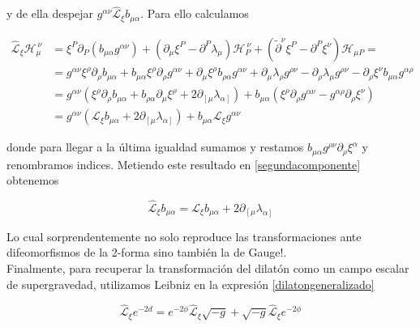 \documentclass{article}
\numberwithin{equation}{section}
\begin{document}
y de ella despejar $ g^{\alpha \nu}  \hat{\mathcal{L}}_{\xi} b_{\mu\alpha} $. Para ello calculamos

\begin{equation}\label{key}
\begin{aligned}
\hat{\mathcal{L}}_{\xi} \mathcal{H}_{\mu}^{\ \nu} &= \xi^P\partial_P \left(b_{\mu\alpha}g^{\alpha\nu}\right) + \left(\partial_{\mu} \xi^P - \partial^P\lambda_{\mu}\right)\mathcal{H}_P^{\ \nu} + \left(\widetilde{\partial}^{\nu} \xi^P - \partial^P\xi^{\nu}\right)\mathcal{H}_{\mu P}=\\
&=g^{\alpha\nu} \xi^{\rho}\partial_{\rho} b_{\mu\alpha} + b_{\mu\alpha} \xi^{\rho}\partial_{\rho}g^{\alpha\nu} +\partial_{\mu} \xi^{\rho}b_{\rho\alpha}g^{\alpha\nu} +\partial_{\mu} \lambda_{\rho}g^{\rho\nu} - \partial_{\rho}\lambda_{\mu}g^{\rho\nu} - \partial_{\rho}\xi^{\nu}b_{\mu\alpha}g^{\alpha\rho}\\
&= g^{\alpha\nu} \left( \xi^{\rho}\partial_{\rho} b_{\mu\alpha} + b_{\rho\alpha} \partial_{\mu} \xi^{\rho} + 2\partial_{\left[\mu\right.}\lambda_{\left.\alpha\right]} \right) + b_{\mu\alpha} \left( \xi^{\rho}\partial_{\rho}g^{\alpha\nu} -g^{\alpha\rho}\partial_{\rho}\xi^{\nu} \right)\\
&= g^{\alpha\nu}\left(\mathcal{L}_{\xi}b_{\mu\alpha} + 2\partial_{\left[\mu\right.}\lambda_{\left.\alpha\right]}\right) + b_{\mu\alpha} \mathcal{L}_{\xi} g^{\alpha\nu}
\end{aligned}
\end{equation}

donde para llegar a la última igualdad sumamos y restamos $ b_{\mu\alpha} g^{\rho\nu}\partial_{\rho}\xi^{\alpha} $ y renombramos indices. Metiendo este resultado en \ref{segundacomponente} obtenemos

\begin{equation}\label{key}
\hat{\mathcal{L}}_{\xi} b_{\mu\alpha} = \mathcal{L}_{\xi}b_{\mu\alpha} + 2\partial_{\left[\mu\right.}\lambda_{\left.\alpha\right]}
\end{equation}

Lo cual sorprendentemente no solo reproduce las transformaciones ante difeomorfismos de la 2-forma sino también la de Gauge!.\\

Finalmente, para recuperar la transformación del dilatón como un campo escalar de supergravedad, utilizamos Leibniz en la expresión \ref{dilatongeneralizado}

\begin{equation}\label{hatd1}
\hat{\mathcal{L}}_{\xi} e^{-2d} = e^{-2\phi} \hat{\mathcal{L}}_{\xi}\sqrt{-g} + \sqrt{-g}\hat{\mathcal{L}}_{\xi} e^{-2\phi}
\end{equation}
\end{document}
